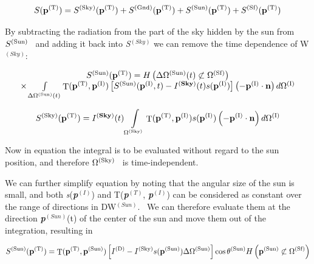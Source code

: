 \begin{equation}
S({{\bf{p}}^{{\rm{(T)}}}}) = {S^{{\rm{(Sky)}}}}({{\bf{p}}^{{\rm{(T)}}}}) + {S^{{\rm{(Gnd)}}}}({{\bf{p}}^{{\rm{(T)}}}}) + {S^{{\rm{(Sun)}}}}({{\bf{p}}^{{\rm{(T)}}}}) + {S^{{\rm{(Sf)}}}}({{\bf{p}}^{{\rm{(T)}}}})
\end{equation}

By subtracting the radiation from the part of the sky hidden by the sun from \({S^{{\rm{(Sun)}}}}\) ~and adding it back into \emph{S}\(^{(Sky)}\) we can remove the time dependence of W\(^{(Sky)}\):

\begin{equation}
\begin{array}{c}{S^{{\rm{(Sun)}}}}({{\bf{p}}^{{\rm{(T)}}}}) = H\left( {\Delta {\Omega ^{{\rm{(Sun)}}}}(t) \not\subset {\Omega ^{{\rm{(Sf)}}}}} \right)\\ \times \int\limits_{\Delta {\Omega ^{{\rm{(Sun)}}}}(t)} {{\mathop{\rm T}\nolimits} ({{\bf{p}}^{{\rm{(T)}}}},{{\bf{p}}^{{\rm{(I)}}}})\left[ {{S^{{\rm{(Sun)}}}}({{\bf{p}}^{{\rm{(I)}}}},t) - {I^{({\bf{Sky}})}}(t)s({{\bf{p}}^{{\rm{(I)}}}})} \right]\left( { - {{\bf{p}}^{{\rm{(I)}}}}\cdot {\bf{n}}} \right)d{\Omega ^{{\rm{(I)}}}}} \end{array}
\end{equation}

\begin{equation}
{S^{{\rm{(Sky)}}}}({{\bf{p}}^{{\rm{(T)}}}}) = {I^{({\bf{Sky}})}}(t)\int\limits_{{\Omega ^{{\rm{(Sky)}}}}} {{\mathop{\rm T}\nolimits} ({{\bf{p}}^{{\rm{(T)}}}},{{\bf{p}}^{{\rm{(I)}}}})s({{\bf{p}}^{{\rm{(I)}}}})\left( { - {{\bf{p}}^{{\rm{(I)}}}}\cdot {\bf{n}}} \right)d{\Omega ^{{\rm{(I)}}}}}
\end{equation}

Now in equation the integral is to be evaluated without regard to the sun position, and therefore \({\Omega ^{{\rm{(Sky)}}}}\) ~is time-independent.

We can further simplify equation by noting that the angular size of the sun is small, and both \emph{s}(\textbf{\emph{p}}\(^{(I)}\)) and T(\textbf{\emph{p}}\(^{(T)}\), \textbf{\emph{p}}\(^{(I)}\)) can be considered as constant over the range of directions in DW\(^{(Sun)}\).~ We can therefore evaluate them at the direction \textbf{\emph{p}}\(^{(Sun)}\)(t) of the center of the sun and move them out of the integration, resulting in

\begin{equation}
{S^{{\rm{(Sun)}}}}({{\bf{p}}^{{\rm{(T)}}}}) = {\mathop{\rm T}\nolimits} ({{\bf{p}}^{{\rm{(T)}}}},{{\bf{p}}^{{\rm{(Sun)}}}})\left[ {{I^{{\rm{(D)}}}} - {I^{{\rm{(Sky)}}}}s({{\bf{p}}^{{\rm{(Sun)}}}})\Delta {\Omega ^{{\rm{(Sun)}}}}} \right]\cos {\theta ^{{\rm{(Sun)}}}}H\left( {{{\bf{p}}^{{\rm{(Sun)}}}} \not\subset {\Omega ^{{\rm{(Sf)}}}}} \right)
\end{equation}

